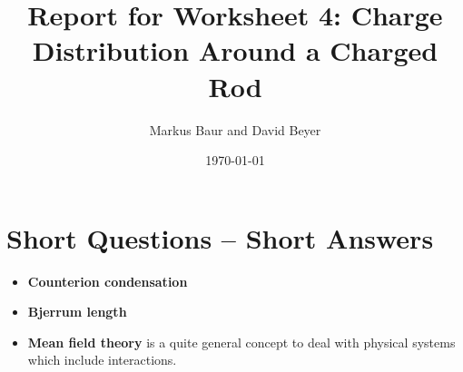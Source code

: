 \documentclass[a4paper,10pt,bibtotoc]{scrartcl}
\begin{document}
\titlehead{Simulation Methods in Physics II \hfill SS 2020}
\title{Report for Worksheet 4: Charge Distribution Around a Charged Rod}
\author{Markus Baur and David Beyer}
\date{\today}
\maketitle

\tableofcontents

\section{Short Questions -- Short Answers}
\begin{itemize}
 \item \textbf{Counterion condensation}
 \item \textbf{Bjerrum length}
 \item \textbf{Mean field theory} is a quite general concept to deal with physical systems which include interactions.
\end{itemize}
\end{document}
